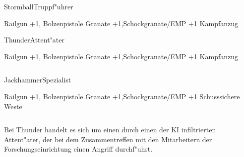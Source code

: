 \begin{column}[l]{0.45}
    \begin{nscsheet}[h]{Stormball\newline{}Truppf"uhrer}
        \nscstats[ATT=3,AGG=3,CON=2]
        \nscruler
        \begin{nscinventory}
            \nscitem[Waffen] Railgun +1, Bolzenpistole
            \nscitem[Granaten] Granate +1,\newline{}Schockgranate/EMP +1
            \nscitem[R"ustung] Kampfanzug
        \end{nscinventory}
    \end{nscsheet}

    \begin{nscsheet}[h]{Thunder\newline{}Attent"ater}
        \nscstats[ATT=3,AGG=3,CON=2]
        \nscruler
        \begin{nscinventory}
            \nscitem[Waffen] Railgun +1, Bolzenpistole
            \nscitem[Granaten] Granate +1,\newline{}Schockgranate/EMP +1
            \nscitem[R"ustung] Kampfanzug
        \end{nscinventory}
    \end{nscsheet}
\end{column}
\begin{column}[r]{0.45}
    \begin{nscsheet}[h]{Jackhammer\newline{}Spezialist}
        \nscstats[ATT=2,AGG=2,DEX=3,CON=2]
        \nscruler
        \begin{nscinventory}
            \nscitem[Waffen] Railgun +1, Bolzenpistole
            \nscitem[Granaten] Granate +1,\newline{}Schockgranate/EMP +1
            \nscitem[R"ustung] Schusssichere Weste
        \end{nscinventory}
    \end{nscsheet}
\end{column}

\medskip
Bei Thunder handelt es sich um einen durch einen der KI infiltrierten Attent"ater, der bei dem Zusammentreffen mit den 
Mitarbeitern der Forschungseinrichtung einen Angriff durchf"uhrt.
